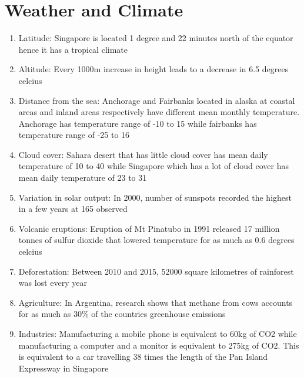 \documentclass[oneside]{book}
\begin{document}
\chapter{Weather and Climate}
\begin{minipage}{0.5\textwidth}
\begin{enumerate}
  \item Latitude: Singapore is located 1 degree and 22 minutes north of the equator hence it has a tropical climate

  \item Altitude: Every 1000m increase in height leads to a decrease in 6.5 degrees celcius
  
  \item Distance from the sea: Anchorage and Fairbanks located in alaska at coastal areas and inland areas respectively have different mean monthly temperature. Anchorage has temperature range of -10 to 15 while fairbanks has temperature range of -25 to 16
  
  \item Cloud cover: Sahara desert that has little cloud cover has mean daily temperature of 10 to 40 while Singapore which has a lot of cloud cover has mean daily temperature of 23 to 31
  
  \item Variation in solar output: In 2000, number of sunspots recorded the highest in a few years at 165 observed
  
  \item Volcanic eruptions: Eruption of Mt Pinatubo in 1991 released 17 million tonnes of sulfur dioxide that lowered temperature for as much as 0.6 degrees celcius
  
  \item Deforestation: Between 2010 and 2015, 52000 square kilometres of rainforest was lost every year
  
  \item Agriculture: In Argentina, research shows that methane from cows accounts for as much as 30\% of the countries greenhouse emissions
  
  \item Industries: Manufacturing a mobile phone is equivalent to 60kg of CO2 while manufacturing a computer and a monitor is equivalent to 275kg of CO2. This is equivalent to a car travelling 38 times the length of the Pan Island Expressway in Singapore
\end{enumerate}
\vspace{1.5cm}
\end{minipage}
\end{document}

